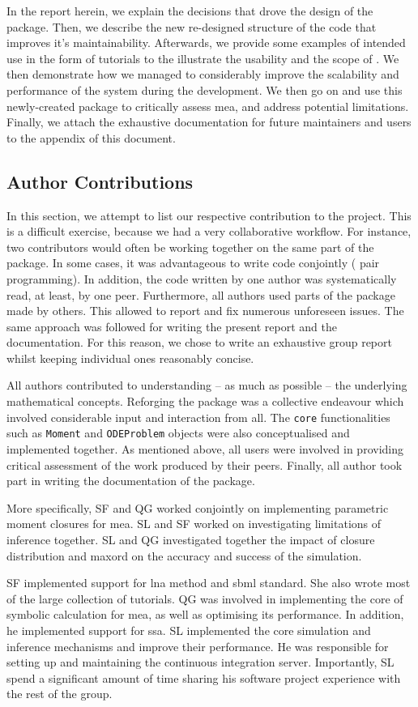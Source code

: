 In the report herein, we explain the decisions that drove the design of the package.
Then, we describe the new re-designed structure of the code that improves it's maintainability.
Afterwards, we provide some examples of intended use in the form of tutorials to the illustrate the usability and the scope of \means.
We then demonstrate how we managed to considerably improve the scalability and performance of the system during the development.
We then go on and use this newly-created package to critically assess \gls{mea}, and address potential limitations.
Finally, we attach the exhaustive documentation for future maintainers and users to the appendix of this document.

\subsection{Author Contributions}
In this section, we attempt to list our respective contribution to the project.
This is a difficult exercise, because we had a very collaborative workflow.
For instance,  two contributors would often be working together on the same part of the package.
In some cases, it was advantageous to write code conjointly (\ie{} pair programming).
In addition, the code written by one author was systematically read, at least, by one peer.
Furthermore,  all authors used  parts of the package made by others.
This allowed to report and fix numerous unforeseen issues.
The same approach was followed for writing the present report and the documentation.
For this reason, we chose to write an exhaustive group report whilst keeping individual ones reasonably concise.


All authors contributed to understanding -- as much as possible -- the underlying mathematical concepts.
Reforging the package was a collective endeavour which involved considerable input and interaction from all.
The \texttt{core} functionalities such as \texttt{Moment} and \texttt{ODEProblem} objects were also conceptualised and implemented together.  
As mentioned above, all users were involved in providing critical assessment of the work produced by their peers.
Finally, all author took part in writing the documentation of the package.

More specifically, SF and QG worked conjointly on implementing parametric moment closures for \gls{mea}.
SL and SF worked on  investigating limitations of inference together.
SL and QG investigated together the impact of closure distribution and \gls{maxord} on the accuracy and success of the simulation.


SF implemented support for \gls{lna} method and \gls{sbml} standard.
She also wrote most of the large collection of tutorials.
QG was involved in implementing the core of symbolic calculation for \gls{mea}, as well as optimising its performance.
In addition, he implemented support for \gls{ssa}.
SL implemented the core simulation and inference mechanisms and improve their performance.
He was responsible for setting up and maintaining the continuous integration server.
Importantly, SL spend a significant amount of time sharing his software project experience with the rest of the group.



